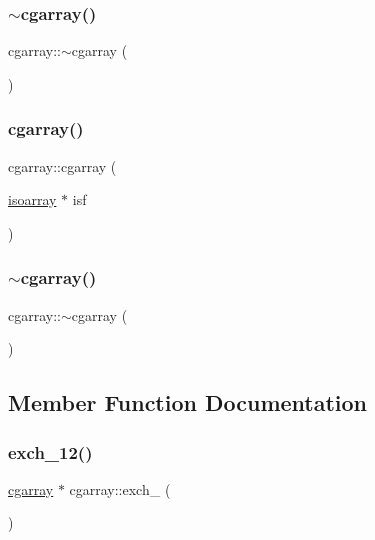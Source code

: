 \subsubsection{\texorpdfstring{$\sim$cgarray()}{~cgarray()}\hspace{0.1cm}{\footnotesize\ttfamily [2/3]}}
{\footnotesize\ttfamily cgarray\+::$\sim$cgarray (\begin{DoxyParamCaption}{ }\end{DoxyParamCaption})}

\mbox{\label{classcgarray_a0a9d804cf3256428f8d8937749a8b776}} 
\subsubsection{\texorpdfstring{cgarray()}{cgarray()}\hspace{0.1cm}{\footnotesize\ttfamily [3/3]}}
{\footnotesize\ttfamily cgarray\+::cgarray (\begin{DoxyParamCaption}\item[{\mbox{\hyperlink{classisoarray}{isoarray}} $\ast$}]{isf }\end{DoxyParamCaption})}

\mbox{\label{classcgarray_af332defc2438028410ad8e2ae98aa848}} 
\subsubsection{\texorpdfstring{$\sim$cgarray()}{~cgarray()}\hspace{0.1cm}{\footnotesize\ttfamily [3/3]}}
{\footnotesize\ttfamily cgarray\+::$\sim$cgarray (\begin{DoxyParamCaption}{ }\end{DoxyParamCaption})}



\subsection{Member Function Documentation}
\mbox{\label{classcgarray_a59212ed070a6ebdc199063d7c7eaee50}} 
\subsubsection{\texorpdfstring{exch\_12()}{exch\_12()}\hspace{0.1cm}{\footnotesize\ttfamily [1/3]}}
{\footnotesize\ttfamily \mbox{\hyperlink{classcgarray}{cgarray}} $\ast$ cgarray\+::exch\+\_ (\begin{DoxyParamCaption}{ }\end{DoxyParamCaption})}

